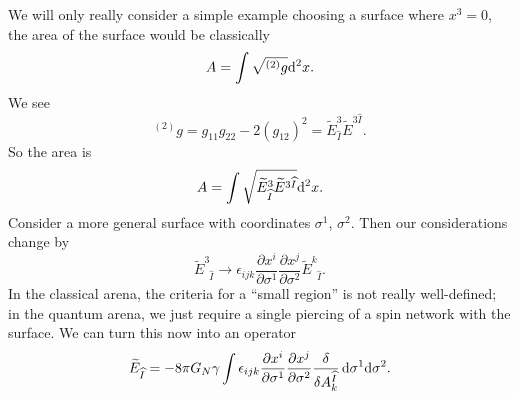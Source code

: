 We will only really consider a simple example choosing a surface where
$x^{3}=0$, the area of the surface would be classically
\begin{equation}
A = \int\sqrt{{}^{(2)}g}\mathrm{d}^{2}x.
\end{equation}
We see
\begin{equation}
{}^{(2)}g = g_{11}g_{22} - 2(g_{12})^{2} = \widetilde{E}^{3}_{\widehat{I}} \widetilde{E}^{3\widehat{I}}.
\end{equation}
So the area is
\begin{equation}
A = \int\sqrt{\widetilde{E}^{3}_{\widehat{I}} \widetilde{E}^{3\widehat{I}}}\mathrm{d}^{2}x.
\end{equation}
Consider a more general surface with coordinates $\sigma^{1}$, $\sigma^{2}$.
Then our considerations change by
\begin{equation}
\widetilde{E}^{3}_{\phantom{3}\widehat{I}}\to\epsilon_{ijk}\frac{\partial x^{i}}{\partial\sigma^{1}}\frac{\partial x^{j}}{\partial\sigma^{2}}\widetilde{E}^{k}_{\phantom{k}\widehat{I}}.
\end{equation}
In the classical arena, the criteria for a ``small region'' is not
really well-defined; in the quantum arena, we just require a single
piercing of a spin network with the surface. We can turn this now into an
operator
\begin{equation}
\widetilde{E}_{\widehat{I}} = -8\pi G_{N}\gamma\int\epsilon_{ijk}\frac{\partial x^{i}}{\partial\sigma^{1}}\frac{\partial x^{j}}{\partial\sigma^{2}}\frac{\delta}{\delta
A^{\widehat{I}}_{k}}\,\mathrm{d}\sigma^{1}\mathrm{d}\sigma^{2}.
\end{equation}
